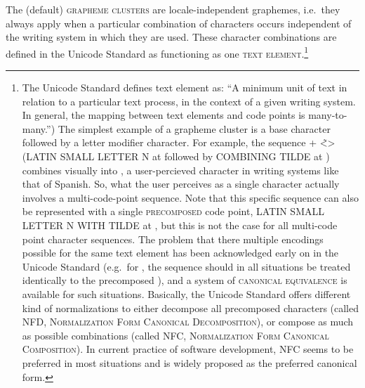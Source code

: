 {{{{{{{{{{{{{{The (default) \textsc{grapheme clusters} are locale-independent graphemes, i.e.~they always apply when a particular combination of characters occurs independent of the writing system in which they are used. These character combinations are defined in the Unicode Standard as functioning as one \textsc{text element}.\footnote{The Unicode Standard defines text element as: ``A minimum unit of text in relation to a particular text process, in the context of a given writing system. In general, the mapping between text elements and code points is many-to-many.'') The simplest example of a grapheme cluster is a base character followed by a letter modifier character. For example, the sequence + <̃\textgreater{} (LATIN SMALL LETTER N at  followed by COMBINING TILDE at ) combines visually into , a user-percieved character in writing systems like that of Spanish. So, what the user perceives as a single character actually involves a multi-code-point sequence. Note that this specific sequence can also be represented with a single \textsc{precomposed} code point, LATIN SMALL LETTER N WITH TILDE at , but this is not the case for all multi-code point character sequences. The problem that there multiple encodings possible for the same text element has been acknowledged early on in the Unicode Standard (e.g.~for , the sequence   should in all situations be treated identically to the precomposed ), and a system of \textsc{canonical equivalence} is available for such situations. Basically, the Unicode Standard offers different kind of normalizations to either decompose all precomposed characters (called \textsc{NFD}, \textsc{Normalization Form Canonical Decomposition}), or compose as much as possible combinations (called \textsc{NFC}, \textsc{Normalization Form Canonical Composition}). In current practice of software development, NFC seems to be preferred in most situations and is widely proposed as the preferred canonical form.

}}}}}}}}}}}}}}}
